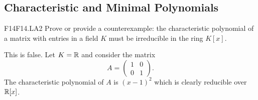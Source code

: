 \documentclass[../AlgebraQualSolutions.tex]{subfiles}
\begin{document}
\subsection{Characteristic and Minimal Polynomials}

\begin{prob}{F14}{F14.LA2}
	Prove or provide a counterexample: the characteristic polynomial of a matrix with entries in a field $K$ must be irreducible in the ring $K[x]$.
\end{prob}

\begin{solution}
	This is false. Let $K = \mathbb{R}$ and consider the matrix
		\[A = \begin{pmatrix} 1 & 0 \\ 0 & 1 \end{pmatrix}. \]
	The characteristic polynomial of $A$ is $(x-1)^2$ which is clearly reducible over $\mathbb{R}[x]$.
\end{solution}
\end{document}
